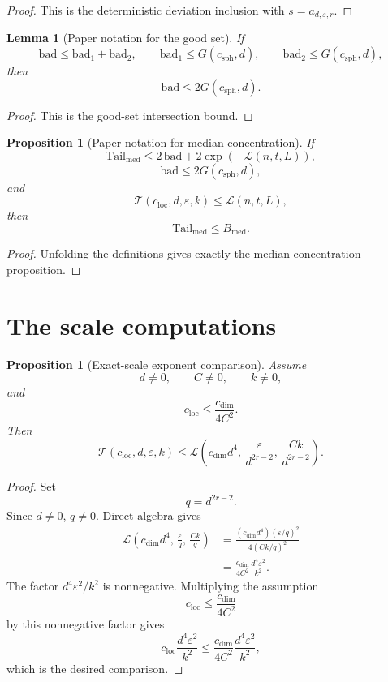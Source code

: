 \documentclass[11pt]{article}
\newtheorem{lemma}[theorem]{Lemma}
\newtheorem{proposition}[theorem]{Proposition}
\begin{document}
\begin{proof}
This is the deterministic deviation inclusion with
\(s=a_{d,\varepsilon,r}\).
\end{proof}

\begin{lemma}[Paper notation for the good set]
If
\[
 \mathrm{bad}\le \mathrm{bad}_1+\mathrm{bad}_2,\qquad
 \mathrm{bad}_1\le G(c_{\mathrm{sph}},d),\qquad
 \mathrm{bad}_2\le G(c_{\mathrm{sph}},d),
\]
then
\[
 \mathrm{bad}\le 2G(c_{\mathrm{sph}},d).
\]
\end{lemma}

\begin{proof}
This is the good-set intersection bound.
\end{proof}

\begin{proposition}[Paper notation for median concentration]
If
\[
 \mathrm{Tail}_{\mathrm{med}}
 \le
 2\,\mathrm{bad}
 +2\exp(-\mathcal L(n,t,L)),
\]
\[
 \mathrm{bad}\le 2G(c_{\mathrm{sph}},d),
\]
and
\[
 \mathcal T(c_{\mathrm{loc}},d,\varepsilon,k)\le \mathcal L(n,t,L),
\]
then
\[
 \mathrm{Tail}_{\mathrm{med}}\le B_{\mathrm{med}}.
\]
\end{proposition}

\begin{proof}
Unfolding the definitions gives exactly the median concentration proposition.
\end{proof}

\section{The scale computations}

\begin{proposition}[Exact-scale exponent comparison]
Assume
\[
  d\ne0,\qquad C\ne0,\qquad k\ne0,
\]
and
\[
  c_{\mathrm{loc}}\le \frac{c_{\mathrm{dim}}}{4C^2}.
\]
Then
\[
 \mathcal T(c_{\mathrm{loc}},d,\varepsilon,k)
 \le
 \mathcal L\!\left(
     c_{\mathrm{dim}}d^4,\,
     \frac{\varepsilon}{d^{2r-2}},\,
     \frac{Ck}{d^{2r-2}}
   \right).
\]
\end{proposition}

\begin{proof}
Set
\[
  q=d^{2r-2}.
\]
Since \(d\ne0\), \(q\ne0\).  Direct algebra gives
\[
\begin{aligned}
 \mathcal L\!\left(
     c_{\mathrm{dim}}d^4,\,
     \frac{\varepsilon}{q},\,
     \frac{Ck}{q}
   \right)
 &=
 \frac{(c_{\mathrm{dim}}d^4)(\varepsilon/q)^2}
      {4(Ck/q)^2} \\
 &=
 \frac{c_{\mathrm{dim}}}{4C^2}
 \frac{d^4\varepsilon^2}{k^2}.
\end{aligned}
\]
The factor \(d^4\varepsilon^2/k^2\) is nonnegative.  Multiplying the
assumption
\[
 c_{\mathrm{loc}}\le \frac{c_{\mathrm{dim}}}{4C^2}
\]
by this nonnegative factor gives
\[
 c_{\mathrm{loc}}\frac{d^4\varepsilon^2}{k^2}
 \le
 \frac{c_{\mathrm{dim}}}{4C^2}\frac{d^4\varepsilon^2}{k^2},
\]
which is the desired comparison.
\end{proof}
\end{document}
